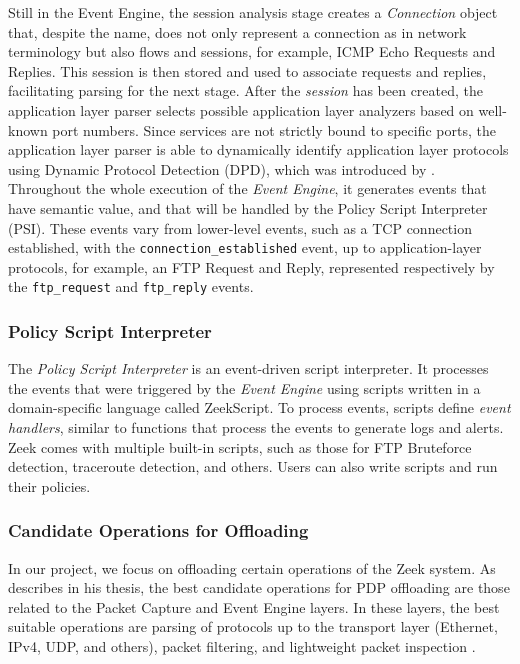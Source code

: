 Still in the Event Engine, the session analysis stage creates a \textit{Connection} object that, despite the name, does not only represent a connection as in network terminology but also flows and sessions, for example, ICMP Echo Requests and Replies. This session is then stored and used to associate requests and replies, facilitating parsing for the next stage. After the \textit{session} has been created, the application layer parser selects possible application layer analyzers based on well-known port numbers. Since services are not strictly bound to specific ports, the application layer parser is able to dynamically identify application layer protocols using Dynamic Protocol Detection (DPD), which was introduced by . Throughout the whole execution of the \textit{Event Engine}, it generates events that have semantic value, and that will be handled by the Policy Script Interpreter (PSI). These events vary from lower-level events, such as a TCP connection established, with the \texttt{connection\_established} event, up to application-layer protocols, for example, an FTP Request and Reply, represented respectively by the \texttt{ftp\_request} and  \texttt{ftp\_reply} events.


\subsubsection*{Policy Script Interpreter}
\label{sec:bg:zeek_psi}

The \textit{Policy Script Interpreter} is an event-driven script interpreter. It processes the events that were triggered by the \textit{Event Engine} using scripts written in a domain-specific language called ZeekScript. To process events, scripts define \textit{event handlers}, similar to functions that process the events to generate logs and alerts. Zeek comes with multiple built-in scripts, such as those for FTP Bruteforce detection, traceroute detection, and others. Users can also write scripts and run their policies.


\subsubsection*{Candidate Operations for Offloading}
\label{sec:bg:zeek_candidate_operations}

In our project, we focus on offloading certain operations of the Zeek system. As  describes in his thesis, the best candidate operations for PDP offloading are those related to the Packet Capture and Event Engine layers. In these layers, the best suitable operations are parsing of protocols up to the transport layer (Ethernet, IPv4, UDP, and others), packet filtering, and lightweight packet inspection \cite{Ilha2022}.

